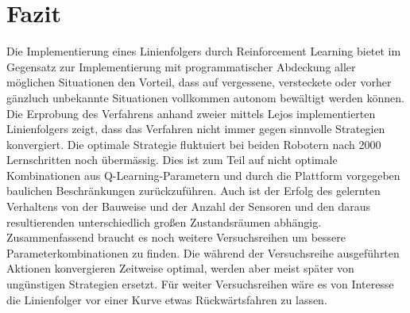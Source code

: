 \chapter{Fazit} %
\label{cha:fazit}

Die Implementierung eines Linienfolgers durch Reinforcement Learning bietet im Gegensatz zur Implementierung mit programmatischer Abdeckung aller möglichen Situationen den Vorteil, dass auf vergessene, versteckete oder vorher gänzluch unbekannte Situationen vollkommen autonom bewältigt werden können. Die Erprobung des Verfahrens anhand zweier mittels Lejos implementierten Linienfolgers zeigt, dass das Verfahren nicht immer gegen sinnvolle Strategien konvergiert. Die optimale Strategie fluktuiert bei beiden Robotern nach 2000 Lernschritten noch übermässig. Dies ist zum Teil auf nicht optimale Kombinationen aus Q-Learning-Pa\-ra\-metern und durch die Plattform vorgegeben baulichen Beschränkungen zurückzuführen. Auch ist der Erfolg des gelernten Verhaltens von der Bauweise und der Anzahl der Sensoren und den daraus resultierenden unterschiedlich großen Zustandsräumen abhängig. Zusammenfassend braucht es noch weitere Versuchsreihen um bessere Parameterkombinationen zu finden. Die während der Versuchsreihe ausgeführten Aktionen konvergieren Zeitweise optimal, werden aber meist später von ungünstigen Strategien ersetzt. Für weiter Versuchsreihen wäre es von Interesse die Linienfolger vor einer Kurve etwas Rückwärtsfahren zu lassen.

